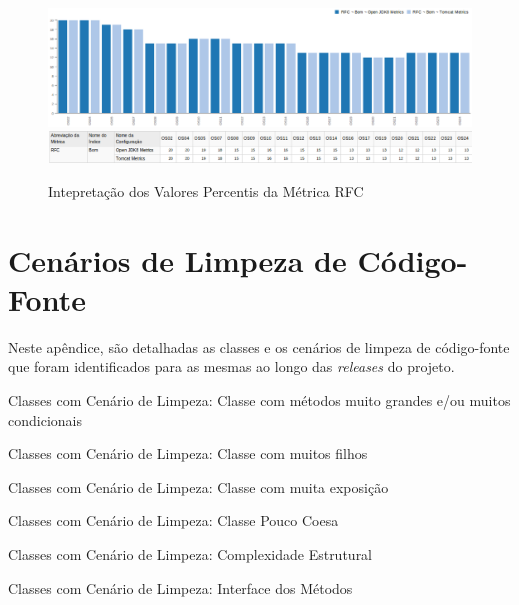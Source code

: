 \begin{apendicesenv}
\begin{figure}
\centering
\includegraphics[scale=0.70]{figuras/rfc-grafico.eps}
\includegraphics[scale=0.70]{figuras/rfc-tabela.eps}
\caption{Intepretação dos Valores Percentis da Métrica RFC}
\label{fig:metric-rfc}
\FloatBarrier
\end{figure}

\chapter{Cenários de Limpeza de Código-Fonte}
\label{scenarios}

Neste apêndice, são detalhadas as classes e os cenários de limpeza de código-fonte que foram identificados para as mesmas ao longo das \textit{releases} do projeto. 

\begin{table}[H]
\centering

\caption{Classes com Cenário de Limpeza: Classe com métodos muito grandes e/ou muitos condicionais}
\end{table}

\begin{table}[H]
\centering

\caption{Classes com Cenário de Limpeza: Classe com muitos filhos}
\end{table}

\begin{table}[H]
\centering

\caption{Classes com Cenário de Limpeza: Classe com muita exposição}
\end{table}

\begin{table}[H]
\centering

\caption{Classes com Cenário de Limpeza: Classe Pouco Coesa}
\end{table}
\FloatBarrier

\begin{table}[H]
\centering

\caption{Classes com Cenário de Limpeza: Complexidade Estrutural}
\end{table}
\FloatBarrier

\begin{table}[H]
\centering

\caption{Classes com Cenário de Limpeza: Interface dos Métodos}
\end{table}



\end{apendicesenv}
